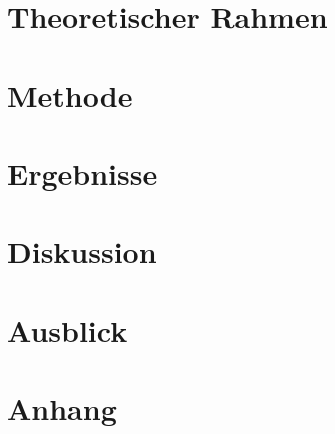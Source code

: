 \documentclass[12pt,oneside, DIV11]{scrbook}
\begin{document}
\chapter{Theoretischer Rahmen}

\chapter{Methode}

\chapter{Ergebnisse}

\chapter{Diskussion}

\chapter{Ausblick}



\appendix 



\backmatter	

\printbibliography[heading=bibintoc]

\chapter{Anhang}

\end{document}

